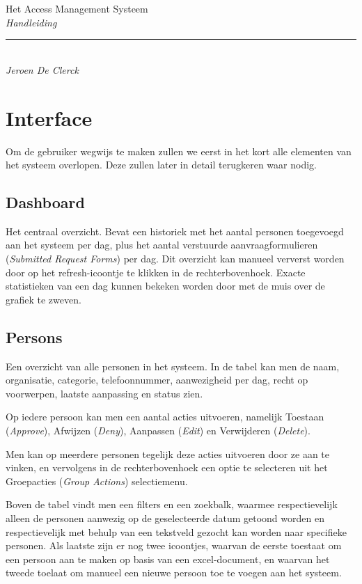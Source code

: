 \documentclass[]{memoir}
\begin{document}
\begingroup%
\centering
\vspace*{0.1\textheight}
{\Huge Het Access Management Systeem}\\[\baselineskip]
{\large\itshape Handleiding}\\[\baselineskip]
\vfill
\rule{0.4\textwidth}{0.4pt}\\[\baselineskip]
{\large\itshape Jeroen De Clerck}\par
\vspace*{0.1\textheight}
\endgroup

\clearpage
\tableofcontents

\chapter{Interface}
Om de gebruiker wegwijs te maken zullen we eerst in het kort alle elementen van het systeem overlopen. Deze zullen later in detail terugkeren waar nodig.

\section{Dashboard}
Het centraal overzicht. Bevat een historiek met het aantal personen toegevoegd aan het systeem per dag, plus het aantal verstuurde aanvraagformulieren (\textsl{Submitted Request Forms}) per dag. Dit overzicht kan manueel ververst worden door op het refresh-icoontje te klikken in de rechterbovenhoek. Exacte statistieken van een dag kunnen bekeken worden door met de muis over de grafiek te zweven.

\section{Persons}
Een overzicht van alle personen in het systeem. In de tabel kan men de naam, organisatie, categorie, telefoonnummer, aanwezigheid per dag, recht op voorwerpen, laatste aanpassing en status zien.

Op iedere persoon kan men een aantal acties uitvoeren, namelijk Toestaan (\textsl{Approve}), Afwijzen  (\textsl{Deny}), Aanpassen (\textsl{Edit}) en Verwijderen (\textsl{Delete}).

Men kan op meerdere personen tegelijk deze acties uitvoeren door ze aan te vinken, en vervolgens in de rechterbovenhoek een optie te selecteren uit het Groepacties  (\textsl{Group Actions}) selectiemenu.

Boven de tabel vindt men een filters en een zoekbalk, waarmee respectievelijk alleen de personen aanwezig op de geselecteerde datum getoond worden en respectievelijk met behulp van een tekstveld gezocht kan worden naar specifieke personen. Als laatste zijn er nog twee icoontjes, waarvan de eerste toestaat om een persoon aan te maken op basis van een excel-document, en waarvan het tweede toelaat om manueel een nieuwe persoon toe te voegen aan het systeem.
\end{document}
